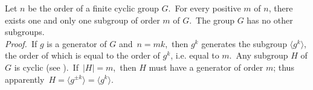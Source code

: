 \documentclass[12pt]{article}
\theoremstyle{definition}
\begin{document}
Let $n$ be the order of a finite cyclic group $G$.\, For every positive  $m$ of $n$, there exists one and only one subgroup of order $m$ of $G$.\, The group $G$ has no other subgroups.\\

\emph{Proof.}\, If $g$ is a generator of $G$ and\, $n = mk$,\, then $g^k$ generates the subgroup $\langle g^k\rangle$, the order of which is equal to the order of $g^k$, i.e. equal to $m$.\, Any subgroup $H$ of $G$ is cyclic (see ).\, If\, $|H| = m$,\, then $H$ must have a generator of order $m$; thus apparently\, $H = \langle g^{\pm k}\rangle = \langle g^k\rangle$.
\end{document}
